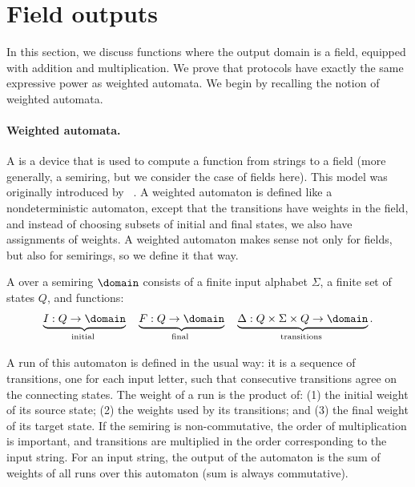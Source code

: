 \section{Field outputs}
\label{sec:field-domain}
In this section, we discuss functions where the output domain is a field, equipped with addition and multiplication. We prove that protocols have  exactly the same expressive power as weighted automata.
We begin by recalling the notion of weighted automata.

\paragraph*{Weighted automata.} \AP A  is a device that
is used to compute a function from strings to a field (more generally, a
semiring, but we consider the case of fields here). This model was originally
introduced by \schutz~\cite{schutzenberger1961definition}. A weighted automaton is defined like a nondeterministic automaton, except that the transitions have weights in the field, and instead of choosing subsets of initial and final states, we also have assignments of weights. A weighted automaton makes sense not only for fields, but also for semirings, so we define it that way. 
\begin{definition}
    \label{def:weighted-automaton-nondeterministic}
    \AP
    A  over a semiring $\domain$ consists of a finite input alphabet $\Sigma$,  a finite set of states $Q$, and functions: 
    \begin{align}
        \label{eq:weight-functions}
    \myunderbrace{I : Q \to \domain}{initial}
    \quad
    \myunderbrace{F : Q \to \domain}{final}
    \quad
    \myunderbrace{\Delta : Q \times \Sigma \times Q \to \domain}{transitions}.
    \end{align}
\end{definition}
A run of this automaton is defined in the usual way: it is a sequence of
transitions, one for each input letter, such that consecutive transitions
agree on the connecting states. The weight of a run is the product of: (1) the
initial weight of its source state; (2) the weights used by its transitions;
and (3) the final weight of its target state. If the semiring is
non-commutative, the order of multiplication is  important, and transitions
are multiplied in the order corresponding to the input string. For an input
string, the output of the automaton is the sum of weights of all runs over
this automaton (sum is always commutative). 

